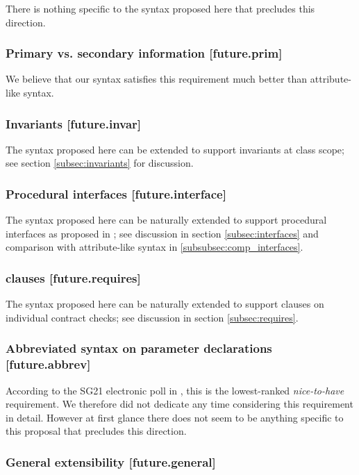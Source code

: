 There is nothing specific to the syntax proposed here that precludes this direction.

\subsubsection{Primary vs. secondary information  [future.prim]}

We believe that our syntax satisfies this requirement much better than attribute-like syntax.

\subsubsection{Invariants  [future.invar]}

The syntax proposed here can be extended to support invariants at class scope; see section \ref{subsec:invariants} for discussion.

\subsubsection{Procedural interfaces  [future.interface]}

The syntax proposed here can be naturally extended to support procedural interfaces as proposed in \cite{P0465R0}; see discussion in section \ref{subsec:interfaces} and comparison with attribute-like syntax in \ref{subsubsec:comp_interfaces}.

\subsubsection{ clauses  [future.requires]}

The syntax proposed here can be naturally extended to support  clauses on individual contract checks; see discussion in section \ref{subsec:requires}.

\subsubsection{Abbreviated syntax on parameter declarations  [future.abbrev]}

According to the SG21 electronic poll in \cite{P2885R3}, this is the lowest-ranked \emph{nice-to-have} requirement. We therefore did not dedicate any time considering this requirement in detail. However at first glance there does not seem to be anything specific to this proposal that precludes this direction.

\subsubsection{General extensibility  [future.general]}

